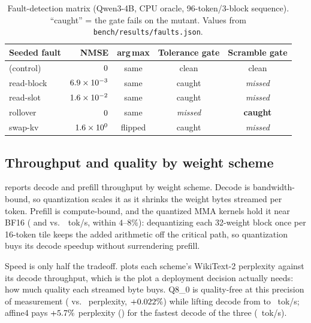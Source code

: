 \documentclass[sigconf,nonacm,screen]{acmart}
\newcommand{\code}[1]{\texttt{\small #1}}
\begin{document}
\begin{table}[t]\centering\small
\caption{Fault-detection matrix (Qwen3-4B, CPU oracle, 96-token/3-block
sequence). ``caught'' = the gate fails on the mutant. Values from
\code{bench/results/faults.json}.}
\label{tab:faults}
\begin{tabular}{lrccc}
\toprule
Seeded fault & NMSE & arg\,max & Tolerance gate & Scramble gate \\
\midrule
(control)    & $0$        & same    & clean   & clean \\
read-block   & $6.9\times 10^{-3}$ & same & caught  & \emph{missed} \\
read-slot    & $1.6\times 10^{-2}$ & same & caught  & \emph{missed} \\
rollover     & $0$        & same    & \emph{missed} & \textbf{caught} \\
swap-kv      & $1.6\times 10^{0}$      & flipped & caught  & \emph{missed} \\
\bottomrule
\end{tabular}
\end{table}

\subsection{Throughput and quality by weight scheme}
\label{sec:eval-throughput}
 reports decode and prefill throughput by weight scheme.
Decode is bandwidth-bound, so quantization scales it as it shrinks the
weight bytes streamed per token. Prefill is compute-bound, and the
quantized MMA kernels hold it near BF16 (\PrefillQEight{} and
\PrefillAffine{} vs.\ \PrefillBF~tok/s, within $4$--$8\%$): dequantizing
each 32-weight block once per 16-token tile keeps the added arithmetic off
the critical path, so quantization buys its decode speedup without
surrendering prefill.

Speed is only half the tradeoff.  plots each scheme's
WikiText-2 perplexity against its decode throughput, which is the plot a
deployment decision actually needs: how much quality each streamed byte
buys. Q8\_0 is quality-free at this precision of measurement
(\PplQEight{} vs.\ \PplBF{} perplexity, $+0.022\%$) while
lifting decode from \DecodeBF{} to \DecodeQEight~tok/s; affine4 pays
$+5.7\%$ perplexity (\PplAffine) for the fastest decode of
the three (\DecodeAffineFour~tok/s).
\end{document}
